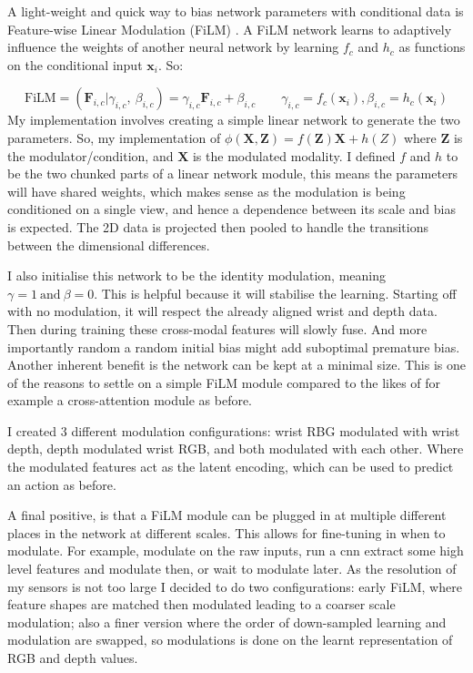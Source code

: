 A light-weight and quick way to bias network parameters with conditional data is Feature-wise Linear Modulation (FiLM) \cite{perez2017film}. A FiLM network learns to adaptively influence the weights of another neural network by learning $f_c$ and $h_c$ as functions on the conditional input $\mathbf{x}_i$. So:

\[
\text{FiLM} = \left( \mathbf{F}_{i, c} | \gamma_{i, c}, ~\beta_{i, c} \right) = \gamma_{i, c}\mathbf{F}_{i, c} + \beta_{i, c} \qquad  \gamma_{i, c} = f_c\left(\mathbf{x}_i \right), \beta_{i, c} = h_c \left( \mathbf {x}_i \right)
\]
My implementation involves creating a simple linear network to generate the two parameters. So, my implementation of \(\phi\left(\mathbf{X}, \mathbf{Z}\right) = f\left(\mathbf{Z}\right)\mathbf{X} + h\left(Z\right)\) where $\mathbf{Z}$ is the modulator/condition, and $\mathbf{X}$ is the modulated modality. I defined $f$ and $h$ to be the two chunked parts of a linear network module, this means the parameters will have shared weights, which makes sense as the modulation is being conditioned on a single view, and hence a dependence between its scale and bias is expected. The 2D data is projected then pooled to handle the transitions between the dimensional differences.

I also initialise this network to be the identity modulation, meaning \(\gamma = 1 ~\text{and} ~\beta = 0\). This is helpful because it will stabilise the learning. Starting off with no modulation, it will respect the already aligned wrist and depth data. Then during training these cross-modal features will slowly fuse. And more importantly random a random initial bias might add suboptimal premature bias. Another inherent benefit is the network can be kept at a minimal size. This is one of the reasons to settle on a simple FiLM module compared to the likes of for example a cross-attention module as before. 

I created 3 different modulation configurations: wrist RBG modulated with wrist depth, depth modulated wrist RGB, and both modulated with each other. Where the modulated features act as the latent encoding, which can be used to predict an action as before.

A final positive, is that a FiLM module can be plugged in at multiple different places in the network at different scales. This allows for fine-tuning in when to modulate. For example, modulate on the raw inputs, run a cnn extract some high level features and modulate then, or wait to modulate later. As the resolution of my sensors is not too large I decided to do two configurations: early FiLM, where feature shapes are matched then modulated leading to a coarser scale modulation; also a finer version where the order of down-sampled learning and modulation are swapped, so modulations is done on the learnt representation of RGB and depth values.


